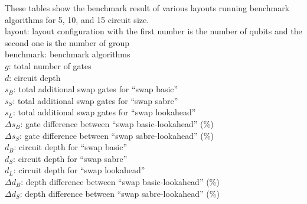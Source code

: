 \documentclass{article}
\begin{document}
These tables show the benchmark result of various layouts running benchmark algorithms for 5, 10, and 15 circuit size. \\
layout: layout configuration with the first number is the number of qubits and the second one is the number of group \\ benchmark: benchmark algorithms \\ $g$: total number of gates \\ $d$: circuit depth \\ $s_B$: total additional swap gates for ``swap basic'' \\ $s_S$: total additional swap gates for ``swap sabre'' \\ $s_L$: total additional swap gates for ``swap lookahead'' \\ $\Delta s_B$: gate difference between ``swap basic-lookahead'' (\%) \\ $\Delta s_S$: gate difference between ``swap sabre-lookahead'' (\%) \\ $d_B$: circuit depth for ``swap basic'' \\ $d_S$: circuit depth for ``swap sabre'' \\ $d_L$: circuit depth for ``swap lookahead'' \\ $\Delta d_B$: depth difference between ``swap basic-lookahead'' (\%) \\ $\Delta d_S$: depth difference between ``swap sabre-lookahead'' (\%) \\

\newpage

\newpage

\end{document}
